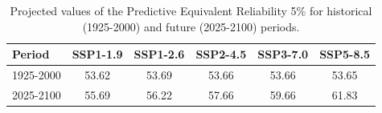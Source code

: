 \begin{table}[htbp]
\centering
\begin{tabular}{lccccc}
\toprule
Period & \textbf{SSP1-1.9} & \textbf{SSP1-2.6} & \textbf{SSP2-4.5} & \textbf{SSP3-7.0} & \textbf{SSP5-8.5} \\
\midrule
1925-2000 & 53.62 & 53.69 & 53.66 & 53.66 & 53.65 \\
2025-2100 & 55.69 & 56.22 & 57.66 & 59.66 & 61.83 \\
\bottomrule
\end{tabular}
\caption{Projected values of the Predictive Equivalent Reliability 5\% for historical (1925-2000) and future (2025-2100) periods.}
\label{tab:pred_scenarios_20per}
\end{table}